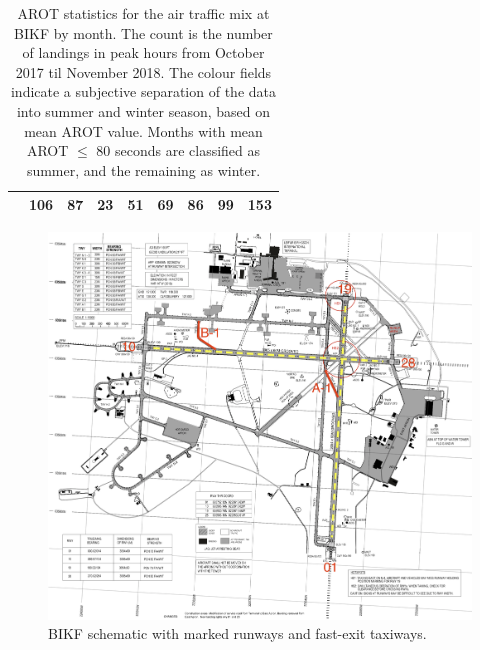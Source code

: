 \begin{table}[h]
{\begin{tabular}{lr|r|r|r|r|r|r|r|}
\rowcolor[HTML]{DAE8FC} 
\multicolumn{1}{|l|}{\cellcolor[HTML]{DAE8FC}December} & 106 & 87 & 23 & 51 & 69 & 86 & 99 & 153 \\ \hline
\end{tabular}%
}
\caption[AROTs for the air traffic mix by month]{AROT statistics for the air traffic mix at BIKF by month. The count is the number of landings in peak hours from October 2017 til November 2018. The colour fields indicate a subjective separation of the data into summer and winter season, based on mean AROT value. Months with mean AROT $\leq$ 80 seconds are classified as summer, and the remaining as winter.}
\label{tab:month2season_arot}
\end{table}

\begin{figure}
    \centering
    \includegraphics[width=1\textwidth]{graphics/BIKF_schematic.png}
    \caption[BIKF schematic]{BIKF schematic with marked runways and fast-exit taxiways.}
    \label{fig:BIKF_schematic}
\end{figure}



